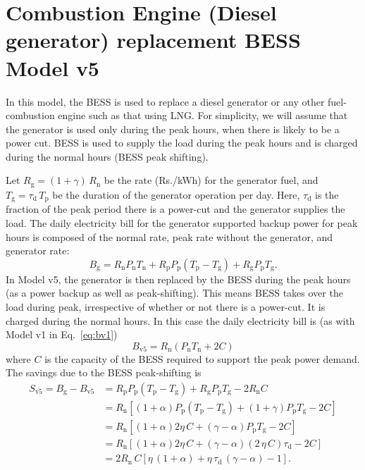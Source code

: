 \section{Combustion Engine (Diesel generator) replacement BESS Model v5}

In this model, the BESS is used to replace a diesel generator or any other
fuel-combustion engine such as that using LNG. For simplicity, we will
assume that the generator is used only during the peak hours, when there
is likely to be a power cut. BESS is used to supply the load during the
peak hours and is charged during the normal hours (BESS peak shifting).

Let $R_{\text{g}} = (1 + \gamma) \, R_\text{n}$ be the rate (Rs./kWh) for the
generator fuel, and $T_{\text{g}} = \tau_{\text{d}} \, T_\text{p} $ be the duration of
the generator operation per day. Here, $\tau_\text{d}$ is the fraction of the
peak period there is a power-cut and the generator supplies the load.  The daily
electricity bill for the generator supported backup power for peak hours is
composed of the normal rate, peak rate without the generator, and generator
rate:
\begin{equation}
    B_{\text{g}} = 
    R_{\text{n}} P_{\text{n}} T_{\text{n}} +
    R_{\text{p}} P_{\text{p}} (T_{\text{p}} - T_\text{g})  + 
    R_{\text{g}} P_{\text{p}} T_{\text{g}} .
\end{equation}
In Model v5, the generator is then replaced by the BESS during the peak hours (as a power
backup as well as peak-shifting). This means BESS takes over the load during
peak, irrespective of whether or not there is a power-cut. It is charged during
the normal hours.  In this case the daily electricity bill is (as with Model v1
in Eq.~\eqref{eq:bv1})
\begin{equation}
    B_{\text{v5}} = 
    R_\text{n} \left( P_{\text{n}} T_{\text{n}} +  
    2 C \right)
\end{equation}
where $C$ is the capacity of the BESS required to support the peak power demand.
The savings due to the BESS peak-shifting is
\begin{align}
    S_\text{v5} = B_{\text{g}} - B_{\text{v5}} 
    & = R_{\text{p}} P_{\text{p}} (T_{\text{p}} - T_\text{g})  + 
    R_{\text{g}} P_{\text{p}} T_{\text{g}} - 2 R_\text{n} C \\
    & = R_\text{n} \left[ (1 + \alpha) P_{\text{p}} (T_{\text{p}} - T_\text{g})  + 
    (1 + \gamma) P_{\text{p}} T_{\text{g}} - 2 C \right]\\
    & = R_\text{n} \left[ (1 + \alpha) 2 \eta \, C + 
    (\gamma - \alpha) P_{\text{p}} T_{\text{g}} - 2 C \right] \\
    & = R_\text{n} \left[ (1 + \alpha) 2 \eta \, C + 
    (\gamma - \alpha) (2 \, \eta \, C) \tau_{\text{d}} - 2 C \right]\\
    & = 2 R_\text{n} \, C \left[ \eta \, (1 + \alpha) +
    \eta \, \tau_{\text{d}} \, (\gamma - \alpha) -  1 \right]. \label{eq:sv5} 
\end{align}
